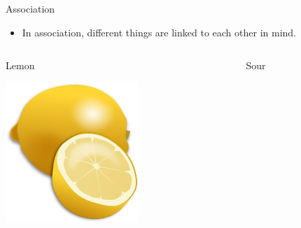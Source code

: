 \documentclass[notes]{beamer}
\begin{document}
\begin{frame}{Association}
	\begin{itemize}
		\item In association, different things are linked to each other in mind.
	\end{itemize}
	\begin{columns}
		\begin{column}{0.3\textwidth}
			\begin{center}
				Lemon
			\end{center}
			\includegraphics[width=\textwidth]{img/lemon.png}
		\end{column} \pause
			\begin{column}{0.3\textwidth}
				\begin{center}
					Sour
				\end{center}

\end{column}
\end{columns}
\end{frame}
\end{document}
